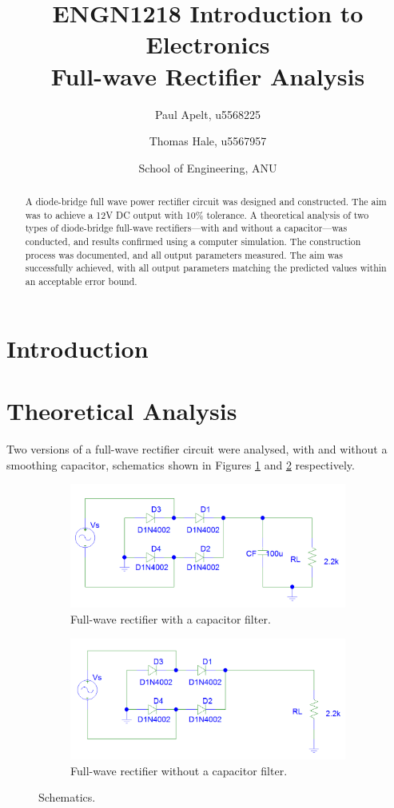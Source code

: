 \documentclass[12pt]{article}
\title{
ENGN1218 Introduction to Electronics\\
Full-wave Rectifier Analysis\\
}
\author{
\and Paul Apelt, u5568225
\and Thomas Hale, u5567957
\and School of Engineering, ANU 
}
\begin{document}
\maketitle
\begin{abstract}
A diode-bridge full wave power rectifier circuit was designed and constructed. The aim was to achieve a 12V DC output with 10\% tolerance. A theoretical analysis of two types of diode-bridge full-wave rectifiers---with and without a capacitor---was conducted, and results confirmed using a computer simulation. The construction process was documented, and all output parameters measured. The aim was successfully achieved, with all output parameters matching the predicted values within an acceptable error bound.
\end{abstract}
\section{Introduction}
\label{sec:int}
\section{Theoretical Analysis}
\label{sec:the}
Two versions of a full-wave rectifier circuit were analysed, with and without a smoothing capacitor, schematics shown in Figures \ref{fig:cap} and \ref {fig:nocap} respectively.
\begin{figure}[h!]
\centering
\begin{subfigure}[b]{0.45\textwidth}
\includegraphics[width=\textwidth]{rekt_cap}
\caption{Full-wave rectifier with a capacitor filter.}
\label{fig:cap}
\end{subfigure}
\qquad
\begin{subfigure}[b]{0.45\textwidth}
\includegraphics[width=\textwidth]{rekt_nocap}
\caption{Full-wave rectifier without a capacitor filter.}
\label{fig:nocap}
\end{subfigure}
\caption{Schematics.}
\label{fig:sch}
\end{figure}
\end{document}
